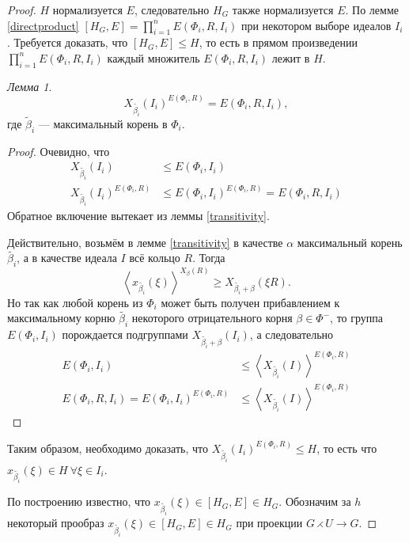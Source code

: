 \documentclass[10pt]{article}
\theoremstyle{remark}
\newtheorem{lm}{Лемма}
\renewcommand{\le}{\leqslant}
\renewcommand{\ge}{\geqslant}
\begin{document}
\begin{proof}
  $H$ нормализуется $E$, следовательно $H_G$ также нормализуется $E$. По лемме \ref{directproduct} $[H_G,E] = \prod_{i=1}^n E(\Phi_i,R,I_i)$ при некотором выборе идеалов $I_i$. Требуется доказать, что $[H_G,E] \le H$, то есть в прямом произведении $\prod_{i=1}^n E(\Phi_i,R,I_i)$ каждый множитель $E(\Phi_i,R,I_i)$  лежит в $H$.
  
\begin{lm}
  $$X_{\widetilde{\beta_i}}(I_i)^{E(\Phi_i,R)} = E(\Phi_i,R,I_i),$$
  где $\widetilde{\beta}_i$ --- максимальный корень в $\Phi_i$.
\end{lm}
\begin{proof}
  Очевидно, что
\begin{align*}
  X_{\widetilde{\beta_i}}(I_i) &\le E(\Phi_i,I_i) \\
  X_{\widetilde{\beta_i}}(I_i)^{E(\Phi_i,R)} &\le E(\Phi_i,I_i)^{E(\Phi_i,R)} = E(\Phi_i,R,I_i)
\end{align*}
  Обратное включение вытекает из леммы \ref{transitivity}.
  
  Действительно, возьмём в лемме \ref{transitivity} в качестве $\alpha$ максимальный корень $\widetilde{\beta_i}$, а в качестве идеала $I$ всё кольцо $R$. Тогда
  $$ \left< x_{\widetilde{\beta_i}}(\xi) \right>^{X_\beta(R)} \ge X_{\widetilde{\beta_i} + \beta}(\xi R). $$
  Но так как любой корень из $\Phi_i$ может быть получен прибавлением к максимальному корню $\widetilde{\beta_i}$ некоторого отрицательного корня $\beta \in \Phi^-$, то группа $E(\Phi_i,I_i)$ порождается подгруппами $X_{\widetilde{\beta_i} + \beta}(I_i)$, а следовательно 
\begin{align*}
E(\Phi_i,I_i) &\le \left< X_{\widetilde{\beta_i}}(I) \right>^{E(\Phi_i,R)}\\
  E(\Phi_i,R,I_i) = E(\Phi_i,I_i)^{E(\Phi_i,R)} &\le \left< X_{\widetilde{\beta_i}}(I) \right>^{E(\Phi_i,R)}
\end{align*}
\end{proof}

Таким образом, необходимо доказать, что $X_{\widetilde{\beta_i}}(I_i)^{E(\Phi_i,R)} \le H$, то есть что
$x_{\widetilde{\beta_i}}(\xi) \in H \ \forall \xi \in I_i$.

По построению известно, что $x_{\widetilde{\beta_i}}(\xi) \in [H_G,E] \in H_G$.
Обозначим за $h$ некоторый прообраз $x_{\widetilde{\beta_i}}(\xi) \in [H_G,E] \in H_G$ при проекции $G \rightthreetimes U \rightarrow G$.


\end{proof}
\end{document}
